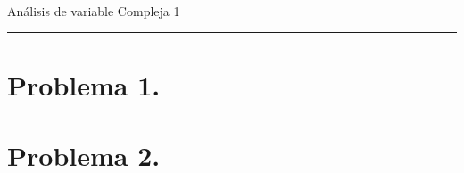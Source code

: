 \documentclass[11pt]{article}
\date{}
\newcommand{\myCourse}{An\'alisis de variable Compleja 1}
\theoremstyle{Tema} \newtheorem{Tema}{Tema} %
\theoremstyle{Tema} \newtheorem{serie}{Serie}              %
\theoremstyle{Tema} \newtheorem{ejercicio}{Ejercicio}    %
\begin{document}

\pagestyle{allStyle}

\thispagestyle{firststyle}
\begin{center}
\LARGE
 \\\normalsize \myCourse %
\medskip
\hrule height 1.5pt
\end{center}

	\section*{\textbf{Problema 1.} }
\bigskip




\section*{\textbf{Problema 2.} }
\end{document}
